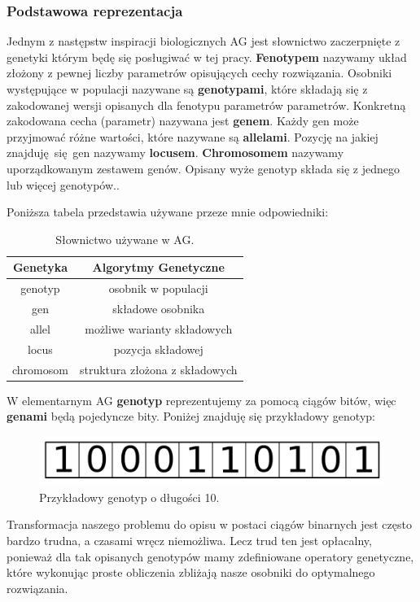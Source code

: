 \documentclass{article}
\begin{document}
\subsubsection{Podstawowa reprezentacja}
Jednym z następstw inspiracji biologicznych AG jest słownictwo zaczerpnięte 
z genetyki którym będę się posługiwać w tej pracy.
\textbf{Fenotypem} nazywamy  układ złożony z pewnej liczby parametrów opisujących cechy
rozwiązania. 
Osobniki występujące w populacji nazywane są \textbf{genotypami}, które 
składają się z zakodowanej wersji opisanych dla fenotypu parametrów parametrów. 
Konkretną zakodowana cecha (parametr) nazywana jest \textbf{genem}. Każdy gen może przyjmować 
różne wartości, które nazywane są \textbf{allelami}. Pozycję na jakiej znajduję się gen nazywamy
\textbf{locusem}. \textbf{Chromosomem} nazywamy uporządkowanym zestawem genów.
Opisany wyże genotyp składa się z jednego lub więcej genotypów.\cite{goldberg}.

Poniższa tabela przedstawia używane przeze mnie odpowiedniki:
\begin{table}[H]
\centering
\begin{tabular}{|c|c|}
	\hline
	Genetyka & Algorytmy Genetyczne\\
	\hline
	genotyp & osobnik w populacji\\
	gen & składowe osobnika\\
	allel & możliwe warianty składowych\\
	locus & pozycja składowej\\
	chromosom & struktura złożona z składowych\\
	\hline
\end{tabular}
\caption{\label{tab:ag}Słownictwo używane w AG.}
\end{table}

W elementarnym AG \textbf{genotyp} reprezentujemy za pomocą ciągów bitów, więc \textbf{genami}
będą pojedyncze bity.
Poniżej znajduję się przykładowy genotyp:\\

\begin{figure}[H]
\centering
\includegraphics[scale=0.20]{genome_v2.png}
\caption{Przykładowy genotyp o długości 10.}
\end{figure}

Transformacja naszego problemu do opisu w postaci ciągów binarnych jest często bardzo trudna, a
czasami wręcz niemożliwa. Lecz trud ten jest opłacalny, ponieważ dla tak opisanych genotypów mamy
zdefiniowane operatory genetyczne, które wykonując proste obliczenia zbliżają nasze osobniki do
optymalnego rozwiązania.
\end{document}
